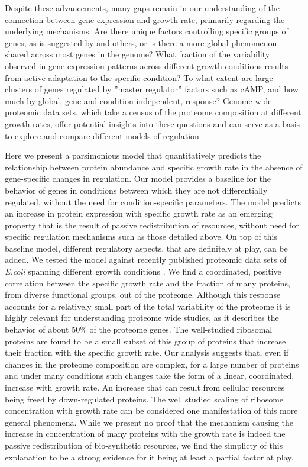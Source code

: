 \documentclass{article}
\begin{document}
Despite these advancements, many gaps remain in our understanding of the connection between gene expression and growth rate, primarily regarding the underlying mechanisms.
Are there unique factors controlling specific groups of genes, as is suggested by \cite{You_2013,Peebo_2015,Hui_2015,Bosdriesz_2015} and others, or is there a more global phenomenon shared across most genes in the genome?
What fraction of the variability observed in gene expression patterns across different growth conditions results from active adaptation to the specific condition?
To what extent are large clusters of genes regulated by ''master regulator'' factors such as cAMP, and how much by global, gene and condition-independent, response?
Genome-wide proteomic data sets, which take a census of the proteome composition at different growth rates, offer potential insights into these questions and can serve as a basis to explore and compare different models of regulation \cite{Valgepea2013,Schmidt2015,Hui_2015,Peebo_2015}.

Here we present a parsimonious model that quantitatively predicts the relationship between protein abundance and specific growth rate in the absence of gene-specific changes in regulation.
Our model provides a baseline for the behavior of genes in conditions between which they are not differentially regulated, without the need for condition-specific parameters.
The model predicts an increase in protein expression with specific growth rate as an emerging property that is the result of passive redistribution of resources, without need for specific regulation mechanisms such as those detailed above.
On top of this baseline model, different regulatory aspects, that are definitely at play, can be added.
We tested the model against recently published proteomic data sets of \emph{E.coli} spanning different growth conditions \cite{Valgepea2013,Peebo_2015,Schmidt2015,Hui_2015}.
We find a coordinated, positive correlation between the specific growth rate and the fraction of many proteins, from diverse functional groups, out of the proteome.
Although this response accounts for a relatively small part of the total variability of the proteome it is highly relevant for understanding proteome wide studies, as it describes the behavior of about $50\%$ of the proteome genes.
The well-studied ribosomal proteins are found to be a small subset of this group of proteins that increase their fraction with the specific growth rate.
Our analysis suggests that, even if changes in the proteome composition are complex, for a large number of proteins and under many conditions such changes take the form of a linear, coordinated, increase with growth rate.
An increase that can result from cellular resources being freed by down-regulated proteins.
The well studied scaling of ribosome concentration with growth rate can be considered one manifestation of this more general phenomena.
While we present no proof that the mechanism causing the increase in concentration of many proteins with the growth rate is indeed the passive redistribution of bio-synthetic resources, we find the simplicty of this explanation to be a strong evidence for it being at least a partial factor at play.
\end{document}
